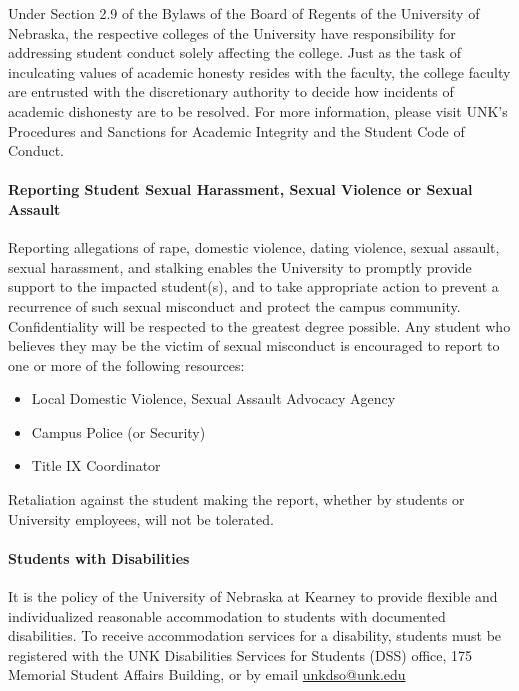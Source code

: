 \documentclass[12pt]{article}
\newcounter{ex}\setcounter{ex}{0}
\begin{document}
Under Section 2.9 of the Bylaws of the Board of Regents of the 
University of Nebraska, the respective colleges of the University 
have responsibility for addressing student conduct solely affecting 
the college. Just as the task of inculcating values of academic 
honesty resides with the faculty, the college faculty 
are entrusted with the discretionary authority to decide 
how incidents of academic dishonesty are to be resolved. 
For more information, please visit UNK's Procedures and 
Sanctions for Academic Integrity and the Student Code of Conduct.


\paragraph{Reporting Student Sexual Harassment, Sexual Violence or Sexual Assault}

Reporting allegations of rape, domestic violence, dating violence, sexual assault, 
sexual harassment, and stalking enables the University to promptly provide support 
to the impacted student(s), and to take appropriate action to prevent a recurrence 
of such sexual misconduct and protect the campus community. Confidentiality will 
be respected to the greatest degree possible. Any student who believes they may 
be the victim of sexual misconduct is encouraged to report to one or more of 
the following resources:

\begin{itemize}
\setlength\itemsep{-0.25em}
  \item Local Domestic Violence, Sexual Assault Advocacy Agency 

  \item Campus Police (or Security) 

  \item Title IX Coordinator 
\end{itemize}
Retaliation against the student making the report, whether by students or 
University employees, will not be tolerated.

\paragraph{Students with Disabilities} It is the policy of the University of Nebraska 
at Kearney to provide flexible and individualized reasonable accommodation 
to students with documented disabilities. To receive accommodation services 
for a disability, students must be registered with the UNK Disabilities Services 
for Students (DSS) office, 175 Memorial Student Affairs Building, 
 or by email 
\href{mailto:unkdso@unk.edu}{unkdso@unk.edu}  
\end{document}
